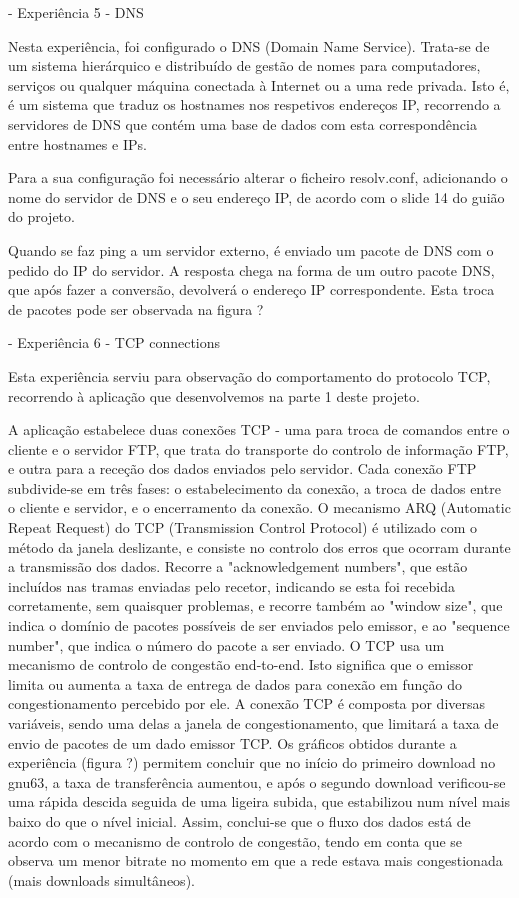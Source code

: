 \documentclass[article, a4paper, 11pt, oneside]{memoir}
\begin{document}
- Experiência 5 - DNS

Nesta experiência, foi configurado o DNS (Domain Name Service). Trata-se de um sistema hierárquico e distribuído de gestão de nomes para computadores, serviços ou qualquer máquina conectada à Internet ou a uma rede privada.
Isto é, é um sistema que traduz os hostnames nos respetivos endereços IP, recorrendo a servidores de DNS que contém uma base de dados com esta correspondência entre hostnames e IPs.

Para a sua configuração foi necessário alterar o ficheiro resolv.conf, adicionando o nome do servidor de DNS e o seu endereço IP, de acordo com o slide 14 do guião do projeto.

Quando se faz ping a um servidor externo, é enviado um pacote de DNS com o pedido do IP do servidor. A resposta chega na forma de um outro pacote DNS, que após fazer a conversão, devolverá o endereço IP correspondente.
Esta troca de pacotes pode ser observada na figura ?

- Experiência 6 - TCP connections

Esta experiência serviu para observação do comportamento do protocolo TCP, recorrendo à aplicação que desenvolvemos na parte 1 deste projeto. 

A aplicação estabelece duas conexões TCP - uma para troca de comandos entre o cliente e o servidor FTP, que trata do transporte do controlo de informação FTP, e outra para a receção dos dados enviados pelo servidor.
Cada conexão FTP subdivide-se em três fases: o estabelecimento da conexão, a troca de dados entre o cliente e servidor, e o encerramento da conexão.
O mecanismo ARQ (Automatic Repeat Request) do TCP (Transmission Control Protocol) é utilizado com o método da janela deslizante, e consiste no controlo dos erros que ocorram durante a transmissão dos dados.
Recorre a "acknowledgement numbers", que estão incluídos nas tramas enviadas pelo recetor, indicando se esta foi recebida corretamente, sem quaisquer problemas, e recorre também ao "window size", que indica o domínio de pacotes possíveis de ser enviados pelo emissor, e ao "sequence number", que indica o número do pacote a ser enviado.
O TCP usa um mecanismo de controlo de congestão end-to-end. Isto significa que o emissor limita ou aumenta a taxa de entrega de dados para conexão em função do congestionamento percebido por ele.
A conexão TCP é composta por diversas variáveis, sendo uma delas a janela de congestionamento, que limitará a taxa de envio de pacotes de um dado emissor TCP.
Os gráficos obtidos durante a experiência (figura ?) permitem concluir que no início do primeiro download no gnu63, a taxa de transferência aumentou, e após o segundo download verificou-se uma rápida descida seguida de uma ligeira subida, que estabilizou num nível mais baixo do que o nível inicial.
Assim, conclui-se que o fluxo dos dados está de acordo com o mecanismo de controlo de congestão, tendo em conta que se observa um menor bitrate no momento em que a rede estava mais congestionada (mais downloads simultâneos).
\end{document}
